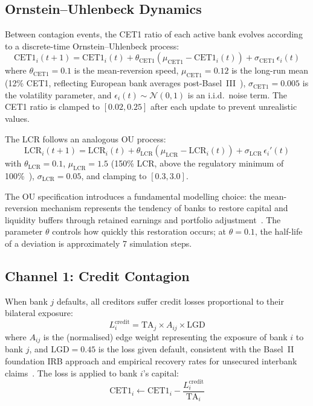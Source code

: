 \subsection{Ornstein--Uhlenbeck Dynamics}

Between contagion events, the CET1 ratio of each active bank evolves according to a discrete-time Ornstein--Uhlenbeck process:
\begin{equation}
    \text{CET1}_i(t+1) = \text{CET1}_i(t) + \theta_{\text{CET1}}\left(\mu_{\text{CET1}} - \text{CET1}_i(t)\right) + \sigma_{\text{CET1}} \,\epsilon_i(t)
    \label{eq:ou-cet1}
\end{equation}
where $\theta_{\text{CET1}} = 0.1$ is the mean-reversion speed, $\mu_{\text{CET1}} = 0.12$ is the long-run mean (12\% CET1, reflecting European bank averages post-Basel~III~\cite{admati2013fallacies}), $\sigma_{\text{CET1}} = 0.005$ is the volatility parameter, and $\epsilon_i(t) \sim \mathcal{N}(0,1)$ is an i.i.d.\ noise term. The CET1 ratio is clamped to $[0.02, 0.25]$ after each update to prevent unrealistic values.

The LCR follows an analogous OU process:
\begin{equation}
    \text{LCR}_i(t+1) = \text{LCR}_i(t) + \theta_{\text{LCR}}\left(\mu_{\text{LCR}} - \text{LCR}_i(t)\right) + \sigma_{\text{LCR}} \,\epsilon_i'(t)
    \label{eq:ou-lcr}
\end{equation}
with $\theta_{\text{LCR}} = 0.1$, $\mu_{\text{LCR}} = 1.5$ (150\% LCR, above the regulatory minimum of 100\%~\cite{drehmann2013model}), $\sigma_{\text{LCR}} = 0.05$, and clamping to $[0.3, 3.0]$.

The OU specification introduces a fundamental modelling choice: the mean-reversion mechanism represents the tendency of banks to restore capital and liquidity buffers through retained earnings and portfolio adjustment~\cite{admati2013fallacies}. The parameter $\theta$ controls how quickly this restoration occurs; at $\theta = 0.1$, the half-life of a deviation is approximately 7 simulation steps.

\subsection{Channel 1: Credit Contagion}

When bank $j$ defaults, all creditors suffer credit losses proportional to their bilateral exposure:
\begin{equation}
    L_i^{\text{credit}} = \text{TA}_j \times A_{ij} \times \text{LGD}
    \label{eq:credit-loss}
\end{equation}
where $A_{ij}$ is the (normalised) edge weight representing the exposure of bank $i$ to bank $j$, and $\text{LGD} = 0.45$ is the loss given default, consistent with the Basel~II foundation IRB approach and empirical recovery rates for unsecured interbank claims~\cite{glasserman2015contagion}. The loss is applied to bank $i$'s capital:
\begin{equation}
    \text{CET1}_i \gets \text{CET1}_i - \frac{L_i^{\text{credit}}}{\text{TA}_i}
    \label{eq:credit-impact}
\end{equation}

